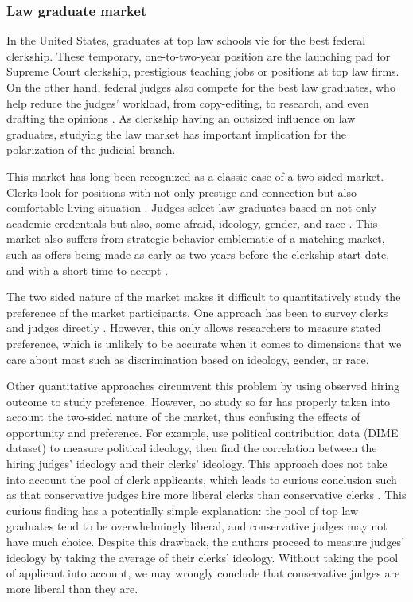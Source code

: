 \subsubsection{Law graduate market}

In the United States, graduates at top law schools vie for the best federal
clerkship. These temporary, one-to-two-year position are the launching pad for Supreme Court clerkship,
prestigious teaching jobs or positions at top law firms. On the other hand,
federal judges also compete for the best law graduates, who help reduce the
judges' workload, from copy-editing, to research, and even drafting the opinions
\citep[795]{Gulati2016, Posner2001}. As clerkship having an outsized influence
on law graduates, studying the law market has important implication for the
polarization of the judicial branch.

This market has long been recognized as a classic case of a two-sided market.
Clerks look for positions with not only prestige and connection but also
comfortable living situation \citep{Posner2001}. Judges select law graduates
based on not only academic credentials but also, some afraid, ideology, gender,
and race \citep{Slotnick1984}. This market also suffers from strategic behavior
emblematic of a matching market, such as offers being
made as early as two years before the clerkship start date, and with a short time to accept \citep{Posner2001, Posner2007}.

The two sided nature of the market makes it difficult to quantitatively study the preference
of the market participants. One approach has been to survey clerks and judges
directly \citep{Peppers2008}. However, this only allows researchers to measure
stated preference, which is unlikely to be accurate when it comes to dimensions
that we care about most such as discrimination based on ideology, gender, or
race.

Other quantitative approaches circumvent this problem by using observed hiring
outcome to study preference. However, no study so far has properly taken into
account the two-sided nature of the market, thus confusing the effects of
opportunity and preference. For example, \citet{Bonica2017} use political
contribution data (DIME dataset) to measure political ideology, then find the
correlation between the hiring judges' ideology and their clerks' ideology. This
approach does not take into account the pool of clerk applicants, which leads to
curious conclusion such as that conservative judges hire more liberal clerks
than conservative clerks \citep[31]{Bonica2017}. This curious finding has a
potentially simple explanation: the pool of top law graduates tend to be
overwhelmingly liberal, and conservative judges may not have much choice.
Despite this drawback, the authors proceed to measure judges' ideology by taking
the average of their clerks' ideology. Without taking the pool of applicant into
account, we may wrongly conclude that conservative judges are more liberal than
they are.

